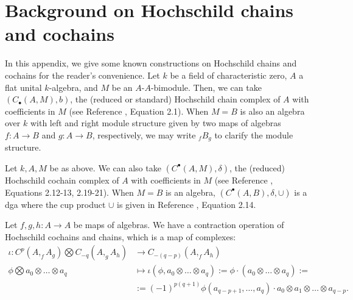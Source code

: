 \chapter{Background on Hochschild chains and cochains}
\label{chap:hochschild}
In this appendix, we give some known 
constructions on Hochschild chains and 
cochains for the reader's convenience. 
%
Let $k$ be a field of characteristic zero, 
$A$ a flat unital $k$-algebra, and $M$ be an 
$A$-$A$-bimodule. Then, we can take 
$(C_\bullet(A,M), b)$, the 
(reduced or standard) Hochschild chain 
complex of $A$ 
with coefficients in $M$ (see Reference 
\cite{T}, Equation 2.1). When $M = B$ is also 
an algebra over $k$ with left and right 
module structure given by two maps of algebras 
$f:A \to B$ and $g:A \to B$, respectively, 
we may write $_fB_g$ to clarify 
the module structure.

Let $k, A, M$ be as above. We can also 
take $(C^\bullet(A,M), \delta)$, the 
(reduced) Hochschild cochain complex of $A$ 
with coefficients in $M$ (see Reference 
\cite{T}, Equations 2.12-13, 2.19-21). When $M=B$ is 
an algebra, $(C^\bullet(A,B), \delta, \cup)$ 
is a dga where the cup product $\cup$ is 
given in Reference \cite{T}, Equation 2.14.

Let $f,g,h:A \to A$ be maps of algebras. 
We have a contraction operation of Hochschild 
cochains and chains, which is a map of complexes:
\begin{align*}
\iota: C^p(A, _fA_g) \bigotimes C_{-q}(A, _gA_h) 
&\longrightarrow 
C_{-(q-p)}(A, _fA_h) \\
\phi \bigotimes a_0\otimes \dots \otimes a_q 
&\mapsto 
\iota(\phi, a_0\otimes \dots \otimes a_q)
:= \phi \cdot (a_0\otimes \dots \otimes a_q) :=\\
&:=
(-1)^{p(q+1)}
\phi(a_{q-p+1},\dots,a_q)\cdot a_0 
\otimes a_1 \otimes \dots \otimes a_{q-p}.
\end{align*}

